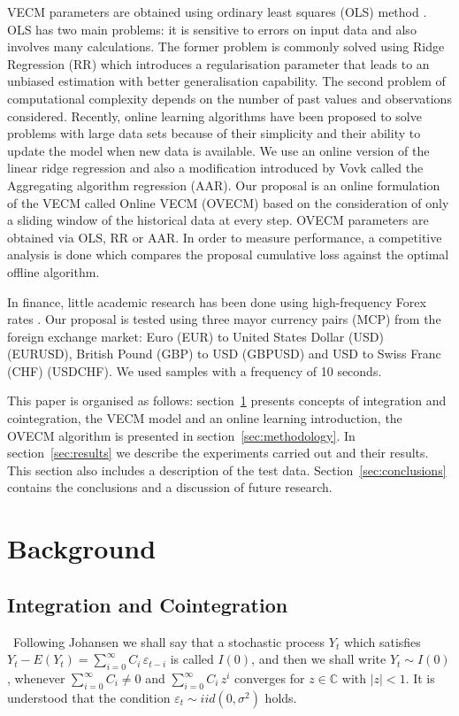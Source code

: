 \documentclass[twocolumn]{svjour3}          %
\begin{document}
VECM parameters are obtained using ordinary least squares
(OLS) method \cite{golub1980}. OLS has two main problems: it is sensitive to errors on input data
and also involves many calculations. The former problem is commonly solved using
Ridge Regression (RR) \cite{hoerl1970} which introduces a regularisation
parameter that leads to an unbiased estimation with better generalisation
capability. The second problem of computational complexity depends on the number
of past values and observations considered.  Recently, online learning
algorithms have been proposed to solve problems with large data sets because of
their simplicity and their ability to update the model when new data is
available. We use an online version of the linear ridge regression and also a modification introduced by 
Vovk \cite{vovk2001} called the Aggregating algorithm regression (AAR).
Our proposal is an online formulation of the VECM called Online VECM (OVECM)
based on the consideration of only a sliding window of the historical data at every step.  OVECM parameters are obtained via OLS, RR or AAR. In order to measure performance, a competitive analysis is done which compares the proposal cumulative loss against the optimal offline algorithm. 

In finance, little academic research has been done using high-frequency Forex
rates \cite{Bekiros2015}. Our proposal is tested using
three mayor currency pairs (MCP) from the foreign exchange market:  Euro (EUR) to United States Dollar (USD) (EURUSD), British Pound (GBP) to
USD (GBPUSD) and USD to Swiss Franc (CHF) (USDCHF). We used samples with a frequency of 10 seconds.

This paper is organised as follows: section~\ref{sec:background} presents concepts of integration and cointegration, the VECM model and an online learning introduction, the OVECM algorithm is presented in section~\ref{sec:methodology}.
In section~\ref{sec:results} we describe the experiments carried out and their results. This section also includes a
description of the test data.  Section~\ref{sec:conclusions} contains the
conclusions and a discussion of future research.


\section{Background}
\label{sec:background}
\subsection{Integration and Cointegration}\label{sec:coint}\  
Following Johansen \cite{johansen1995} we shall say that a stochastic process
$Y_t$ which satisfies $Y_t-E(Y_t) = \sum_{i=0}^\infty C_i\,\varepsilon_{t-i}$ is
called $I(0)$, and then we shall write $Y_t\sim I(0)$, whenever
$\sum_{i=0}^\infty C_i \neq 0$ and $\sum_{i=0}^\infty C_i\,z^i$ converges for
$z\in\mathbb{C}$ with $|z|<1$.  It is understood that the condition
$\varepsilon_t\sim iid(0,\sigma^2)$ holds.
\end{document}
